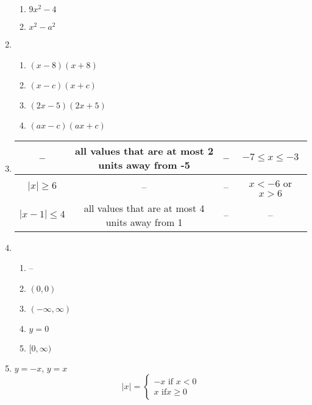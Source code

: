 \documentclass{article}
\begin{document}
\begin{enumerate}
\begin{enumerate}
	\item $9x^2 - 4$
	
	\item $x^2 - a^2$
	
	\end{enumerate}
	
\item

	\begin{enumerate}
	
	\item $(x - 8)(x + 8)$
	
	\item $(x - c)(x + c)$
	
	\item $(2x - 5)(2x + 5)$
	
	\item $(ax - c)(ax + c)$
	
	\end{enumerate}
	
\item 
	\begin{tabular}{| c | c | c | c |}
	\hline
	-- & all values that are at most 2 units away from -5 & -- & $-7 \leq x \leq -3$ \\
	\hline
	$|x| \geq 6$ & -- & -- & $x < -6$ or $x > 6$ \\
	\hline
	$|x - 1| \leq 4$ & all values that are at most 4 units away from 1 & -- & -- \\
	\hline
	\end{tabular}
	
\item

	\begin{enumerate}
	
	\item --
	
	\item $(0,0)$
	
	\item $(-\infty, \infty)$
	
	\item $y = 0$
	
	\item $[0, \infty)$
	
	\end{enumerate}

\item $y = -x$, $y = x$ \\
	\begin{equation*}
	|x| = \begin{cases}
	-x \text{ if } x < 0 \\
	x \text{ if} x \geq 0
	\end{cases}
	\end{equation*}
	

\end{enumerate}
\end{document}
